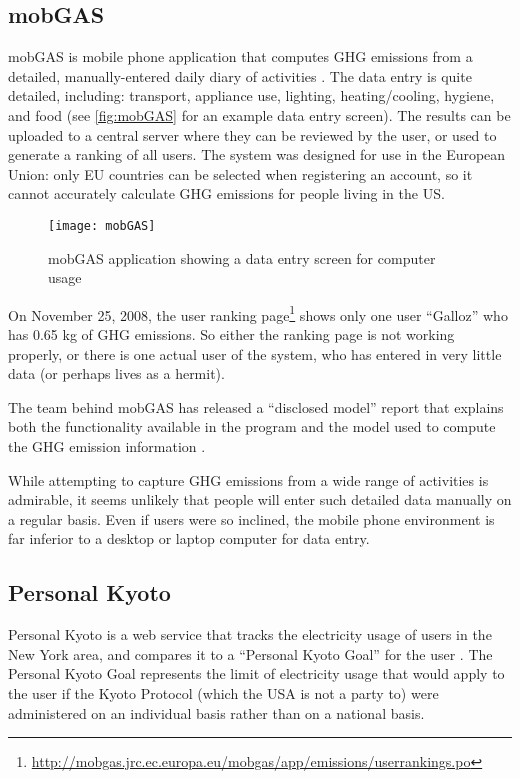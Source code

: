 \subsection{mobGAS}

mobGAS is mobile phone application that computes GHG emissions from a detailed, manually-entered daily diary of activities \cite{mobGAS-website}. The data entry is quite detailed, including: transport, appliance use, lighting, heating/cooling, hygiene, and food (see \autoref{fig:mobGAS} for an example data entry screen). The results can be uploaded to a central server where they can be reviewed by the user, or used to generate a ranking of all users. The system was designed for use in the European Union: only EU countries can be selected when registering an account,  so it cannot accurately calculate GHG emissions for people living in the US.

\begin{figure}[htbp]
	\begin{center}
		\texttt{[image: mobGAS]}
		\caption{mobGAS application showing a data entry screen for computer usage}
		\label{fig:mobGAS}
 	\end{center}
\end{figure}

On November 25, 2008, the user ranking page\footnote{\url{http://mobgas.jrc.ec.europa.eu/mobgas/app/emissions/userrankings.po}} shows only one user ``Galloz'' who has 0.65 kg of GHG emissions. So either the ranking page is not working properly, or there is one actual user of the system, who has entered in very little data (or perhaps lives as a hermit).

The team behind mobGAS has released a ``disclosed model'' report that explains both the functionality available in the program and the model used to compute the GHG emission information \cite{Sousa-Pedrosa2008mobGAS-model}.

While attempting to capture GHG emissions from a wide range of activities is admirable, it seems unlikely that people will enter such detailed data manually on a regular basis. Even if users were so inclined, the mobile phone environment is far inferior to a desktop or laptop computer for data entry.

\subsection{Personal Kyoto}
\label{personal-kyoto}

Personal Kyoto is a web service that tracks the electricity usage of users in the New York area, and compares it to a ``Personal Kyoto Goal'' for the user \cite{Personal-Kyoto-website}. The Personal Kyoto Goal represents the limit of electricity usage that would apply to the user if the Kyoto Protocol (which the USA is not a party to) were administered on an individual basis rather than on a national basis.

